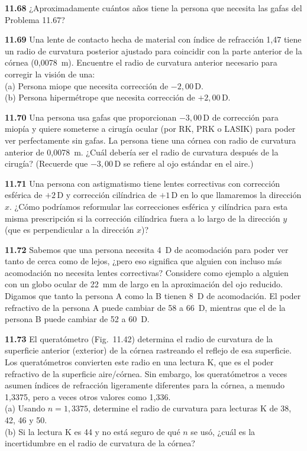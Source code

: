 \documentclass[12pt]{book}
\begin{document}
\textbf{11.68} ¿Aproximadamente cuántos años tiene la persona que necesita las gafas del Problema 11.67?

\textbf{11.69} Una lente de contacto hecha de material con índice de refracción 1,47 tiene un radio de curvatura posterior ajustado para coincidir con la parte anterior de la córnea (0,0078~m). Encuentre el radio de curvatura anterior necesario para corregir la visión de una:\\
(a) Persona miope que necesita corrección de $-2{,}00\,\text{D}$.\\
(b) Persona hipermétrope que necesita corrección de $+2{,}00\,\text{D}$.

\textbf{11.70} Una persona usa gafas que proporcionan $-3{,}00\,\text{D}$ de corrección para miopía y quiere someterse a cirugía ocular (por RK, PRK o LASIK) para poder ver perfectamente sin gafas. La persona tiene una córnea con radio de curvatura anterior de 0,0078~m. ¿Cuál debería ser el radio de curvatura después de la cirugía? (Recuerde que $-3{,}00\,\text{D}$ se refiere al ojo estándar en el aire.)

\textbf{11.71} Una persona con astigmatismo tiene lentes correctivas con corrección esférica de $+2\,\text{D}$ y corrección cilíndrica de $+1\,\text{D}$ en lo que llamaremos la dirección $x$. ¿Cómo podríamos reformular las correcciones esférica y cilíndrica para esta misma prescripción si la corrección cilíndrica fuera a lo largo de la dirección $y$ (que es perpendicular a la dirección $x$)?

\textbf{11.72} Sabemos que una persona necesita 4~D de acomodación para poder ver tanto de cerca como de lejos, ¿pero eso significa que alguien con incluso más acomodación no necesita lentes correctivas? Considere como ejemplo a alguien con un globo ocular de 22~mm de largo en la aproximación del ojo reducido. Digamos que tanto la persona A como la B tienen 8~D de acomodación. El poder refractivo de la persona A puede cambiar de 58 a 66~D, mientras que el de la persona B puede cambiar de 52 a 60~D.

\textbf{11.73} El queratómetro (Fig.~11.42) determina el radio de curvatura de la superficie anterior (exterior) de la córnea rastreando el reflejo de esa superficie. Los queratómetros convierten este radio en una lectura K, que es el poder refractivo de la superficie aire/córnea. Sin embargo, los queratómetros a veces asumen índices de refracción ligeramente diferentes para la córnea, a menudo 1,3375, pero a veces otros valores como 1,336.\\
(a) Usando $n = 1{,}3375$, determine el radio de curvatura para lecturas K de 38, 42, 46 y 50.\\
(b) Si la lectura K es 44 y no está seguro de qué $n$ se usó, ¿cuál es la incertidumbre en el radio de curvatura de la córnea?
\end{document}

